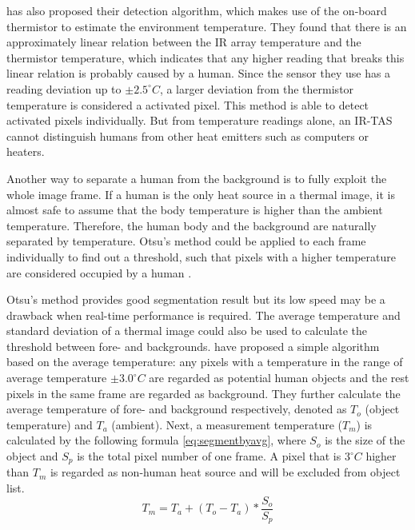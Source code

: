 \citeauthor{trofimova2017indoor} \cite{trofimova2017indoor} has also proposed their detection algorithm, which makes use of the on-board thermistor to estimate the environment temperature. They found that there is an approximately linear relation between the IR array temperature and the thermistor temperature, which indicates that any higher reading that breaks this linear relation is probably caused by a human. Since the sensor they use has a reading deviation up to $\pm 2.5^{\circ}C$, a larger deviation from the thermistor temperature is considered a activated pixel. This method is able to detect activated pixels individually. But from temperature readings alone, an IR-TAS cannot distinguish humans from other heat emitters such as computers or heaters.

Another way to separate a human from the background is to fully exploit the whole image frame. If a human is the only heat source in a thermal image, it is almost safe to assume that the body temperature is higher than the ambient temperature. Therefore, the human body and the background are naturally separated by temperature. Otsu's method could be applied to each frame individually to find out a threshold, such that pixels with a higher temperature are considered occupied by a human \cite{firstflow}.

Otsu's method provides good segmentation result but its low speed may be a drawback when real-time performance is required. The average temperature and standard deviation of a thermal image could also be used to calculate the threshold between fore- and backgrounds. \citeauthor{virtualtrack} \cite{virtualtrack} have proposed a simple algorithm based on the average temperature: any pixels with a temperature in the range of average temperature $\pm 3.0^\circ C$ are regarded as potential human objects and the rest pixels in the same frame are regarded as background.
They further calculate the average temperature of fore- and background respectively, denoted as $T_o$ (object temperature) and $T_a$ (ambient). Next, a measurement temperature ($T_m$) is calculated by the following formula \autoref{eq:segmentbyavg}, where $S_o$ is the size of the object and $S_p$ is the total pixel number of one frame. A pixel that is $3^\circ C$ higher than $T_m$ is regarded as non-human heat source and will be excluded from object list.
\begin{equation}\label{eq:segmentbyavg}
  T_m = T_a + (T_o-T_a)*\frac{S_o}{S_p}
\end{equation}

